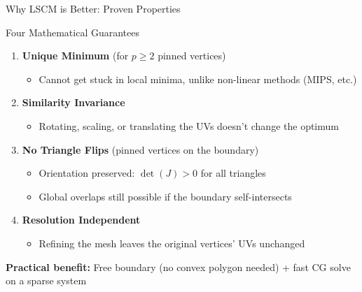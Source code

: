 \documentclass[aspectratio=169]{beamer}
\begin{document}
\begin{frame}{Why LSCM is Better: Proven Properties}

\begin{block}{Four Mathematical Guarantees}
\begin{enumerate}
  \item \textbf{Unique Minimum} (for $p \ge 2$ pinned vertices)
  \begin{itemize}
    \item Cannot get stuck in local minima, unlike non-linear methods (MIPS, etc.)
  \end{itemize}

  \item \textbf{Similarity Invariance}
  \begin{itemize}
    \item Rotating, scaling, or translating the UVs doesn't change the optimum
  \end{itemize}

  \item \textbf{No Triangle Flips} (pinned vertices on the boundary)
  \begin{itemize}
    \item Orientation preserved: $\det(J) > 0$ for all triangles
    \item Global overlaps still possible if the boundary self-intersects
  \end{itemize}

  \item \textbf{Resolution Independent}
  \begin{itemize}
    \item Refining the mesh leaves the original vertices' UVs unchanged
  \end{itemize}
\end{enumerate}
\end{block}

\vspace{0.3em}
\textbf{Practical benefit:} \alert{Free boundary} (no convex polygon needed) + fast CG solve on a sparse system

\end{frame}
\end{document}
